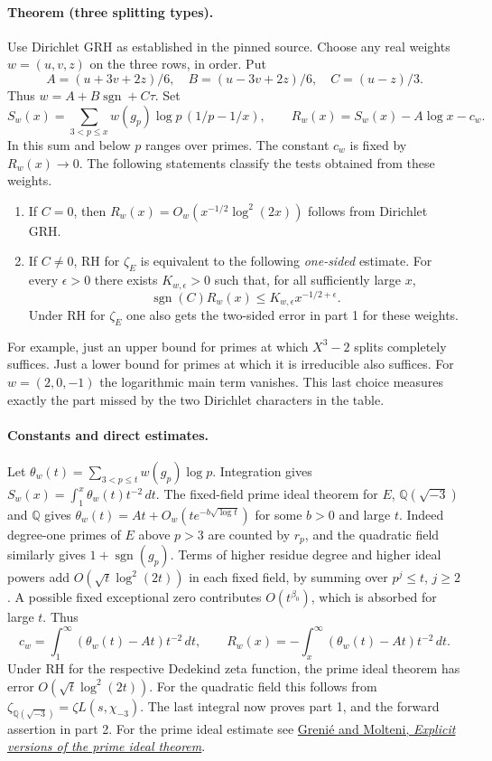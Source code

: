 \paragraph{Theorem (three splitting types).}
Use Dirichlet GRH as established in the pinned source. Choose any real weights
$w=(u,v,z)$ on the three rows, in order. Put
\[
 A=(u+3v+2z)/6,\quad B=(u-3v+2z)/6,\quad C=(u-z)/3.
\]
Thus $w=A+B\operatorname{sgn}+C\tau$. Set
\[
 S_w(x)=\sum_{3<p\le x}w(g_p)\log p\,(1/p-1/x),\qquad
 R_w(x)=S_w(x)-A\log x-c_w.
\]
In this sum and below $p$ ranges over primes. The constant $c_w$ is fixed by
$R_w(x)\to0$. The following statements classify the tests obtained from these weights.
\begin{enumerate}
\item If $C=0$, then $R_w(x)=O_w(x^{-1/2}\log^2(2x))$ follows from Dirichlet GRH.
\item If $C\ne0$, RH for $\zeta_E$ is equivalent to the following
\emph{one-sided} estimate. For every $\epsilon>0$ there exists
$K_{w,\epsilon}>0$ such that, for all sufficiently large $x$,
\[
 \operatorname{sgn}(C) R_w(x)\le K_{w,\epsilon}x^{-1/2+\epsilon}.
\]
Under RH for $\zeta_E$ one also gets the two-sided error in part 1 for these weights.
\end{enumerate}
For example, just an upper bound for primes at which $X^3-2$ splits
completely suffices. Just a lower bound for primes at which it is
irreducible also suffices. For $w=(2,0,-1)$ the logarithmic main term
vanishes. This last choice measures exactly the part missed by the two
Dirichlet characters in the table.

\paragraph{Constants and direct estimates.}
Let $\theta_w(t)=\sum_{3<p\le t}w(g_p)\log p$. Integration gives
$S_w(x)=\int_1^x\theta_w(t)t^{-2}\,dt$. The fixed-field prime ideal
theorem for $E$, $\mathbb Q(\sqrt{-3})$ and $\mathbb Q$ gives
$\theta_w(t)=At+O_w(t e^{-b\sqrt{\log t}})$ for some $b>0$ and large $t$.
Indeed degree-one primes of $E$ above $p>3$ are counted by $r_p$, and the
quadratic field similarly gives $1+\operatorname{sgn}(g_p)$.
Terms of higher residue degree and higher ideal powers add
$O(\sqrt t\log^2(2t))$ in each fixed field, by summing over $p^j\le t$,
$j\ge2$. A possible fixed exceptional zero contributes $O(t^{\beta_0})$,
which is absorbed for large $t$. Thus
\[
 c_w=\int_1^\infty(\theta_w(t)-At)t^{-2}\,dt,\qquad
 R_w(x)=-\int_x^\infty(\theta_w(t)-At)t^{-2}\,dt .
\]
Under RH for the respective Dedekind zeta function, the prime ideal
theorem has error $O(\sqrt t\log^2(2t))$. For the quadratic field this
follows from $\zeta_{\mathbb Q(\sqrt{-3})}=\zeta L(s,\chi_{-3})$.
The last integral now proves part 1, and the forward assertion in part 2.
For the prime ideal estimate see
\href{https://arxiv.org/abs/1312.4463}{Greni\'e and Molteni, \emph{Explicit versions of the prime ideal theorem}}.

